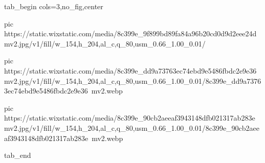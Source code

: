  
 
 
 
 


\ifcmt
  tab_begin cols=3,no_fig,center

     pic https://static.wixstatic.com/media/8c399e_9f899bd89fa84a96b20cd0d9d2eee24d~mv2.jpg/v1/fill/w_154,h_204,al_c,q_80,usm_0.66_1.00_0.01/%

		 pic https://static.wixstatic.com/media/8c399e_dd9a73763ec74ebd9e5486fbdc2e9e36~mv2.jpg/v1/fill/w_154,h_204,al_c,q_80,usm_0.66_1.00_0.01/8c399e_dd9a73763ec74ebd9e5486fbdc2e9e36~mv2.webp

		 pic https://static.wixstatic.com/media/8c399e_90cb2aeeaf3943148dfb021317ab283e~mv2.jpg/v1/fill/w_154,h_204,al_c,q_80,usm_0.66_1.00_0.01/8c399e_90cb2aeeaf3943148dfb021317ab283e~mv2.webp

  tab_end
\fi
